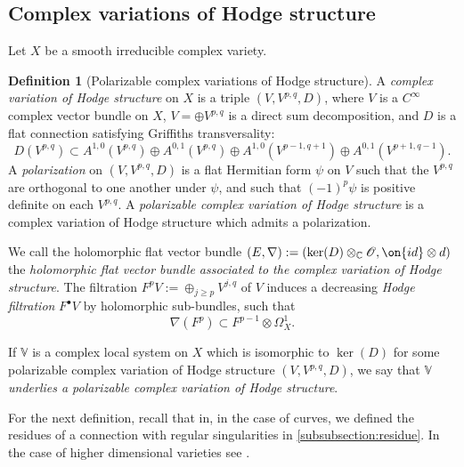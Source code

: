 \documentclass[12 pt]{amsart}
\theoremstyle{plain}
\theoremstyle{definition}
\newtheorem{definition}[subsubsection]{Definition}
\theoremstyle{remark}
\numberwithin{equation}{section}
\begin{document}
\subsection{Complex variations of Hodge structure}
Let $X$ be a smooth irreducible complex variety.
\begin{definition}[Polarizable complex variations of Hodge structure]
	\label{definition:complex-variation}
	A {\em complex variation of Hodge structure} on $X$ is a triple $(V,
	V^{p,q}, D)$, where $V$ is a $C^\infty$ complex vector bundle on $X$,
	$V=\oplus V^{p,q}$ is a direct sum decomposition, and $D$ is a flat
	connection satisfying Griffiths transversality: $$D(V^{p,q})\subset
	A^{1,0}(V^{p,q})\oplus A^{0,1}(V^{p,q})\oplus A^{1,0}(V^{p-1,q+1})\oplus
	A^{0,1}(V^{p+1, q-1}).$$
	A {\em polarization} on $(V, V^{p,q}, D)$ is a flat Hermitian form $\psi$ on $V$ such that the $V^{p,q}$ are orthogonal to one another under $\psi$, and such that $(-1)^p\psi$ is positive definite on each $V^{p,q}$. 
	A {\em polarizable complex variation of Hodge structure} is a complex
	variation of Hodge structure which admits a polarization.
    
    We call the holomorphic flat vector bundle $(E,
    \nabla):=(\ker(D)\otimes_{\mathbb{C}} \mathscr{O}, \on{id}\otimes d)$ the
    {\em holomorphic flat vector bundle associated to the complex variation of
    Hodge structure}. The filtration $F^pV:=\oplus_{j\geq p} V^{j,q}$ of $V$ induces a decreasing \emph{Hodge filtration} $F^\bullet V$ by holomorphic sub-bundles, such that \begin{equation}\label{eqn:griffiths-transversality} \nabla(F^p)\subset F^{p-1}\otimes \Omega^1_X.\end{equation}
    
    If $\mathbb{V}$ is a complex local system on $X$ which is isomorphic to
    $\ker(D)$ for some polarizable complex variation of Hodge structure $(V, V^{p,q}, D)$, we say that $\mathbb{V}$ \emph{underlies a polarizable complex variation of Hodge structure}.
\end{definition}

For the next definition, recall that in, in the case of curves, we defined the
residues of a connection with regular singularities in
\autoref{subsubsection:residue}.
In the case of higher dimensional varieties see 
\cite[p. 53]{deligne:regular-singular}.
\end{document}
